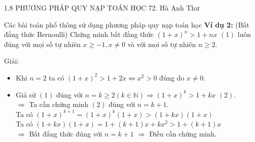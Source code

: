 \begin{frame}{1.8 PHƯƠNG PHÁP QUY NẠP TOÁN HỌC \hspace{2cm}  72. Hà Anh Thư} 
\begin{block}{Các bài toán phổ thông sử dụng phương pháp quy nạp toán học}
\textbf{Ví dụ 2:} (Bất đẳng thức Bernoulli) Chứng minh bất đẳng thức $(1 + x)^n > 1 + nx$ $(1)$ luôn đúng với mọi số tự nhiên $x \ge -1, x \ne 0$ và với mọi số tự nhiên $n \ge 2$. \\
\pause
\begin{center}
    Giải:
\end{center}
\begin{itemize}
    \item Khi $n = 2$ ta có $(1 + x)^2 > 1 + 2x \Leftrightarrow x^2 > 0$ đúng do $x \ne 0$.
    \pause
    \item Giả sử $(1)$ đúng với $n = k \ge 2 (k \in \mathbb{N}) \Rightarrow (1 + x)^k > 1 + kx$ $(2)$. \\
        \pause
        $\Rightarrow$ Ta cần chứng minh $(2)$ đúng với $n = k + 1$. \\
        \pause
        Ta có $(1 + x)^{k + 1} = (1 + x)^k(1 + x) > (1 + kx)(1 + x)$ \\
        \pause
        Ta có $(1 + kx)(1 + x) =  1 + (k + 1)x + kx^2 > 1 + (k + 1)x$ \\
        $\Rightarrow$ Bất đẳng thức đúng với $n = k + 1$ $\Rightarrow$ Điều cần chứng minh.
\end{itemize}
\end{block}

\end{frame}

